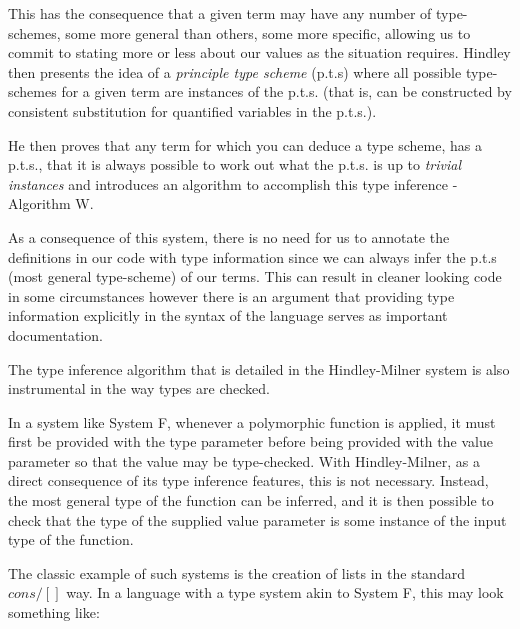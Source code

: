             This has the consequence that a given term may have any number of
            type-schemes, some more general than others, some more specific,
            allowing us to commit to stating more or less about our
            values as the situation requires. Hindley then presents
            the idea of a \textit{principle type scheme} (p.t.s) where
            all possible type-schemes for a given term are instances
            of the p.t.s. (that is, can be constructed by consistent
            substitution for quantified variables in the p.t.s.).
            
            He then proves that any term for which you can deduce a type scheme,
            has a p.t.s., that it is always possible to work out what the p.t.s. is
            up to \textit{trivial instances} and introduces an
            algorithm to accomplish this type inference - Algorithm W.

            As a consequence of this system, there is no need for us to
            annotate the definitions in our code with type
            information since we can always infer the p.t.s (most
            general type-scheme) of our terms. This can result
            in cleaner looking code in some circumstances however
            there is an argument that providing type information
            explicitly in the syntax of the language serves as
            important documentation.
            
            The type inference algorithm that is detailed in the Hindley-Milner
            system is also instrumental in the way types are checked.
            
            In a system like System F, whenever a polymorphic
            function is applied, it must first be provided with the type
            parameter before being provided with
            the value parameter so that the value may be
            type-checked. With Hindley-Milner, as a direct consequence
            of its type inference features, this is not
            necessary. Instead, the
            most general type of the function can be inferred, and it
            is then possible to check that the type of the supplied
            value parameter is some instance of the input type of the function.
            
            The classic example of such systems is the creation of lists in the
            standard $cons/[]$ way. In a language with a type system akin to
            System F, this may look
            something like:
            
